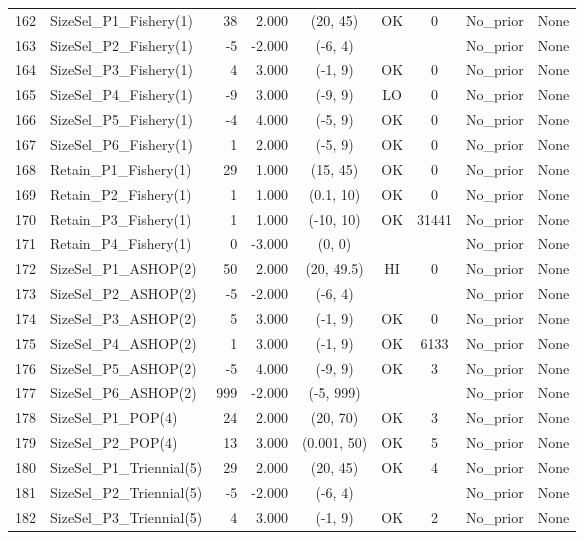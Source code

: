 \documentclass[12pt,]{article}
\begin{document}
\begin{landscape}
\begin{longtable}{rlrrcccll}
  162 & SizeSel\_P1\_Fishery(1) & 38 & 2.000 & (20, 45) & OK & 0 & No\_prior & None \\ 
  163 & SizeSel\_P2\_Fishery(1) & -5 & -2.000 & (-6, 4) &  &  & No\_prior & None \\ 
  164 & SizeSel\_P3\_Fishery(1) & 4 & 3.000 & (-1, 9) & OK & 0 & No\_prior & None \\ 
  165 & SizeSel\_P4\_Fishery(1) & -9 & 3.000 & (-9, 9) & LO & 0 & No\_prior & None \\ 
  166 & SizeSel\_P5\_Fishery(1) & -4 & 4.000 & (-5, 9) & OK & 0 & No\_prior & None \\ 
  167 & SizeSel\_P6\_Fishery(1) & 1 & 2.000 & (-5, 9) & OK & 0 & No\_prior & None \\ 
  168 & Retain\_P1\_Fishery(1) & 29 & 1.000 & (15, 45) & OK & 0 & No\_prior & None \\ 
  169 & Retain\_P2\_Fishery(1) & 1 & 1.000 & (0.1, 10) & OK & 0 & No\_prior & None \\ 
  170 & Retain\_P3\_Fishery(1) & 1 & 1.000 & (-10, 10) & OK & 31441 & No\_prior & None \\ 
  171 & Retain\_P4\_Fishery(1) & 0 & -3.000 & (0, 0) &  &  & No\_prior & None \\ 
  172 & SizeSel\_P1\_ASHOP(2) & 50 & 2.000 & (20, 49.5) & HI & 0 & No\_prior & None \\ 
  173 & SizeSel\_P2\_ASHOP(2) & -5 & -2.000 & (-6, 4) &  &  & No\_prior & None \\ 
  174 & SizeSel\_P3\_ASHOP(2) & 5 & 3.000 & (-1, 9) & OK & 0 & No\_prior & None \\ 
  175 & SizeSel\_P4\_ASHOP(2) & 1 & 3.000 & (-1, 9) & OK & 6133 & No\_prior & None \\ 
  176 & SizeSel\_P5\_ASHOP(2) & -5 & 4.000 & (-9, 9) & OK & 3 & No\_prior & None \\ 
  177 & SizeSel\_P6\_ASHOP(2) & 999 & -2.000 & (-5, 999) &  &  & No\_prior & None \\ 
  178 & SizeSel\_P1\_POP(4) & 24 & 2.000 & (20, 70) & OK & 3 & No\_prior & None \\ 
  179 & SizeSel\_P2\_POP(4) & 13 & 3.000 & (0.001, 50) & OK & 5 & No\_prior & None \\ 
  180 & SizeSel\_P1\_Triennial(5) & 29 & 2.000 & (20, 45) & OK & 4 & No\_prior & None \\ 
  181 & SizeSel\_P2\_Triennial(5) & -5 & -2.000 & (-6, 4) &  &  & No\_prior & None \\ 
  182 & SizeSel\_P3\_Triennial(5) & 4 & 3.000 & (-1, 9) & OK & 2 & No\_prior & None \\ 

\end{longtable}
\end{landscape}
\end{document}
